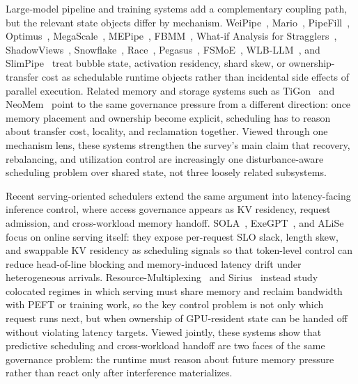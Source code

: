 \documentclass[acmsmall,screen,review]{acmart}
\begin{document}
Large-model pipeline and training systems add a complementary coupling path, but the relevant state objects differ by mechanism. WeiPipe~\cite{lin2025weipipe}, Mario~\cite{liu2025mario}, PipeFill~\cite{arfeen2024pipefill}, Optimus~\cite{feng2025optimus}, MegaScale~\cite{jiang2024megascale}, MEPipe~\cite{sun2025mepipe}, FBMM~\cite{tabatabai2024fbmm}, What-if Analysis for Stragglers~\cite{lin2025whatifstragglers}, ShadowViews~\cite{jiang2025shadowviews}, Snowflake~\cite{vuppalapati2020snowflake}, Race~\cite{zuo2021race}, Pegasus~\cite{li2020pegasus}, FSMoE~\cite{fsmoe25}, WLB-LLM~\cite{wang2025wlbllm}, and SlimPipe~\cite{liu2025slimpipe} treat bubble state, activation residency, shard skew, or ownership-transfer cost as schedulable runtime objects rather than incidental side effects of parallel execution. Related memory and storage systems such as TiGon~\cite{huang2025tigon} and NeoMem~\cite{zhou2024neomem} point to the same governance pressure from a different direction: once memory placement and ownership become explicit, scheduling has to reason about transfer cost, locality, and reclamation together. Viewed through one mechanism lens, these systems strengthen the survey's main claim that recovery, rebalancing, and utilization control are increasingly one disturbance-aware scheduling problem over shared state, not three loosely related subsystems.

Recent serving-oriented schedulers extend the same argument into latency-facing inference control, where access governance appears as KV residency, request admission, and cross-workload memory handoff. SOLA~\cite{hong2025sola}, ExeGPT~\cite{oh2024exegpt}, and ALiSe~\cite{zhao2024alise} focus on online serving itself: they expose per-request SLO slack, length skew, and swappable KV residency as scheduling signals so that token-level control can reduce head-of-line blocking and memory-induced latency drift under heterogeneous arrivals. Resource-Multiplexing~\cite{he2025resourcemultiplexing} and Sirius~\cite{wang2025sirius} instead study colocated regimes in which serving must share memory and reclaim bandwidth with PEFT or training work, so the key control problem is not only which request runs next, but when ownership of GPU-resident state can be handed off without violating latency targets. Viewed jointly, these systems show that predictive scheduling and cross-workload handoff are two faces of the same governance problem: the runtime must reason about future memory pressure rather than react only after interference materializes.
\end{document}
